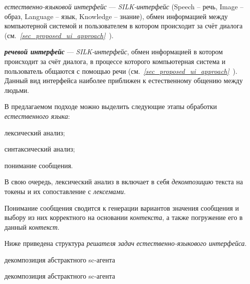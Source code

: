 \textit{естественно-языковой интерфейс} --- \textit{SILK-интерфейс} (Speech – речь, Image – образ, Language – язык, Knowledge – знание), обмен информацией между компьютерной системой и пользователем в котором происходит за счёт диалога (см.~\textit{\ref{sec_proposed_ui_approach}~}).

\begin{SCn}


\end{SCn}

\textbf{\textit{речевой интерфейс}} --- \textit{SILK-интерфейс}, обмен информацией в котором происходит за счёт диалога, в процессе которого компьютерная система и пользователь общаются с помощью речи (см.~\textit{\ref{sec_proposed_ui_approach}~}).
Данный вид интерфейса наиболее приближен к естественному общению между людьми.

В предлагаемом подходе можно выделить следующие этапы обработки \textit{естественного языка}:
\begin{textitemize}
    \item лексический анализ;
    \item синтаксический анализ;
    \item понимание сообщения.
\end{textitemize}

В свою очередь, лексический анализ в включает в себя \textit{декомпозицию} текста на токены и их сопоставление с \textit{лексемами}.

Понимание сообщения сводится к генерации вариантов значения сообщения и выбору из них корректного на основании \textit{контекста}, а также погружение его в данный \textit{контекст}.

Ниже приведена структура \textit{решателя задач} \textit{естественно-языкового интерфейса}.

\begin{SCn}

    \begin{scnrelfromset}{декомпозиция абстрактного sc-агента}
        \begin{scnindent}
            \begin{scnrelfromset}{декомпозиция абстрактного sc-агента}
            \end{scnrelfromset}
        \end{scnindent}
    \end{scnrelfromset}

\end{SCn}

